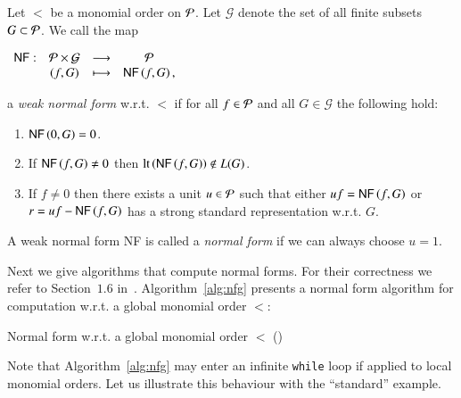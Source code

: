\begin{definition}
Let $<$ be a monomial order on $\mathcal{P}$.
Let $\mathcal G$ denote the set of all finite subsets $G \subset \mathcal{P}$. We call
the map
\begin{center}
$
\begin{array}{rccc}
\text{\sffamily{NF}}: &\mathcal{P} \times \mathcal G &\longrightarrow& \mathcal{P}\\
                     & (f, G) &\longmapsto& \text{\sffamily{NF}}\left({f},{G}\right),
\end{array}
$
\end{center}
a \emph{weak normal form} w.r.t. $<$ if for all $f\in \mathcal{P}$ and all $G \in
\mathcal G$ the following hold:
\begin{enumerate}
\item $\text{\sffamily{NF}}\left({0},{G}\right) = 0$.
\item If $\text{\sffamily{NF}}\left({f},{G}\right) \neq 0$ then $\operatorname{lt}\left({\text{\sffamily{NF}}\left({f},{G}\right)}\right) \notin L(G)$.
\item If $f \neq 0$ then there exists a unit $u\in \mathcal{P}$ such that either
$uf = \text{\sffamily{NF}}\left({f},{G}\right)$ or
$r = uf - \text{\sffamily{NF}}\left({f},{G}\right)$ has a strong standard representation w.r.t. $G$.
\end{enumerate}
A weak normal form {\sffamily NF} is called a \emph{normal form} if we can always
choose $u=1$.
\end{definition}

Next we give algorithms that compute normal forms. For their correctness we
refer to Section~$1.6$ in~\cite{gpSingularBook2007}. Algorithm~\ref{alg:nfg}
presents a normal form algorithm for computation w.r.t. a global monomial order
$<$:

\begin{algorithm}
\caption{Normal form w.r.t. a global monomial order $<$
  (\nfn)} 
\label{alg:nfg}
\begin{algorithmic}[1]
\EndWhile
{}
\end{algorithmic}
\end{algorithm}

Note that Algorithm~\ref{alg:nfg} may enter an infinite \texttt{while} loop if applied
to local monomial orders. Let us illustrate this behaviour with the ``standard''
example. 

